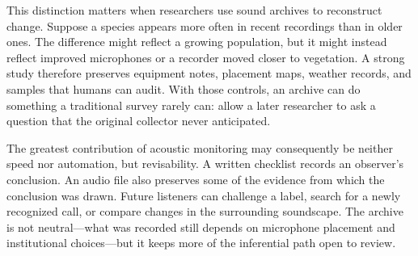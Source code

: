 This distinction matters when researchers use sound archives to reconstruct
change. Suppose a species appears more often in recent recordings than in older
ones. The difference might reflect a growing population, but it might instead
reflect improved microphones or a recorder moved closer to vegetation. A strong
study therefore preserves equipment notes, placement maps, weather records, and
samples that humans can audit. With those controls, an archive can do something
a traditional survey rarely can: allow a later researcher to ask a question that
the original collector never anticipated.

The greatest contribution of acoustic monitoring may consequently be neither
speed nor automation, but revisability. A written checklist records an observer's
conclusion. An audio file also preserves some of the evidence from which the
conclusion was drawn. Future listeners can challenge a label, search for a newly
recognized call, or compare changes in the surrounding soundscape. The archive is
not neutral---what was recorded still depends on microphone placement and
institutional choices---but it keeps more of the inferential path open to review.


